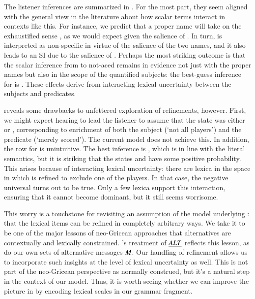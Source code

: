 \documentclass[leqno,12pt]{article}
\begin{document}
The listener inferences are summarized in . For
the most part, they seem aligned with the general view in the
literature about how scalar terms interact in contexts like this. For
instance, we predict that a proper name  will take on the
exhaustified sense , as we would expect given the
salience of . In turn,  is interpreted as
non-specific in virtue of the salience of the two names, and it also
leads to an SI due to the salience of . Perhaps the most
striking outcome is that the scalar inference from  to
not-aced remains in evidence not just with the proper names but also
in the scope of the quantified subjects: the best-guess inference for
 is .  These effects derive from
interacting lexical uncertainty between the subjects and predicates.

 reveals some drawbacks to unfettered exploration
of refinements, however. First, we might expect hearing  to lead the listener to assume that the state was
either  or , corresponding to enrichment of both
the subject (`not all players') and the predicate (`merely
scored'). The current model does not achieve this. In addition, the
row for  is unintuitive. The best inference is
, which is in line with the literal semantics, but it is
striking that the states  and  have some positive
probability. This arises because of interacting lexical uncertainty:
there are lexica in the space in which  is refined to
exclude one of the players. In that case, the negative universal turns
out to be true. Only a few lexica support this interaction, ensuring
that it cannot become dominant, but it still seems worrisome.


This worry is a touchstone for revisiting an assumption of the model
underlying : that the lexical items can be
refined in completely arbitrary ways. We take it to be one of the
major lessons of neo-Gricean approaches that alternatives are
contextually and lexically constrained. \CFS's treatment of $\emph{ALT}$
reflects this lesson, as do our own sets of alternative messages
$M$. Our handling of refinement allows us to incorporate such
insights at the level of lexical uncertainty as well. 
This is not part of the neo-Gricean perspective as normally construed,
but it's a natural step in the context of our model.
Thus, it is worth seeing whether we can improve the picture in
 by encoding lexical scales in our grammar
fragment.
\end{document}
